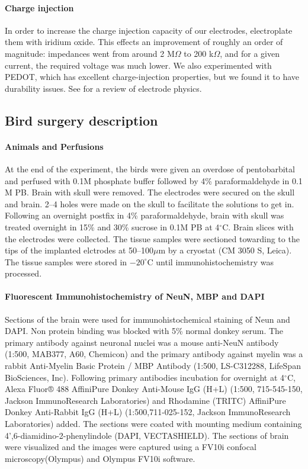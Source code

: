 \documentclass[10pt,letterpaper]{article}
\let\oldmarginpar\marginpar
\renewcommand{\marginpar}[1]{\oldmarginpar{\linespread{1}\scriptsize{#1}}}
\renewcommand{\subsubsection}[1]{\paragraph{#1}}
\begin{document}
\subsubsection{Charge injection}

In order to increase the charge injection capacity of our electrodes,
electroplate them with iridium oxide.  This effects an
improvement of roughly an order of magnitude: impedances went from
around 2 M$\Omega$ to 200 k$\Omega$, and for a given current, the
required voltage was much lower.\marginpar{FIXME} We also experimented
with PEDOT, which has excellent charge-injection properties, but we
found it to have durability issues.\marginpar{All I know about this is
  hearsay.}  See \cite{Cogan2008electrodes} for a review of electrode
physics.
\subsection{Bird surgery description}

\subsubsection{Animals and Perfusions}

At the end of the experiment, the birds were given an overdose of
pentobarbital and perfused with 0.1M phosphate buffer followed by 4\%
paraformaldehyde in 0.1 M PB.  Brain with skull were removed. The
electrodes were secured on the skull and brain. 2--4 holes were made
on the skull to facilitate the solutions to get in. Following an
overnight postfix in 4\% paraformaldehyde, brain with skull was
treated overnight in 15\% and 30\% sucrose\marginpar{Which?} in 0.1M PB at 4$^\circ$C.
Brain slices with the electrodes were collected. The tissue samples
were sectioned towarding to the tips of the implanted elctrodes at
50--100$\mu$m by a cryostat (CM 3050 S, Leica). The tissue samples
were stored in $-20^\circ$C until immunohistochemistry was processed.

\subsubsection{Fluorescent Immunohistochemistry of NeuN, MBP and DAPI}

Sections of the brain were used for immunohistochemical staining of
Neun and DAPI. Non protein binding was blocked with 5\% normal donkey
serum. The primary antibody against neuronal nuclei was a mouse
anti-NeuN antibody (1:500, MAB377, A60, Chemicon) and the primary
antibody against myelin was a rabbit Anti-Myelin Basic Protein / MBP
Antibody (1:500, LS-C312288, LifeSpan BioSciences, Inc). Following
primary antibodies incubation for overnight at 4$^\circ$C, Alexa
Fluor® 488 AffiniPure Donkey Anti-Mouse IgG (H+L) (1:500, 715-545-150,
Jackson ImmunoResearch Laboratories) and Rhodamine (TRITC) AffiniPure
Donkey Anti-Rabbit IgG (H+L) (1:500,711-025-152, Jackson
ImmunoResearch Laboratories) added. The sections were coated with
mounting medium containing 4',6-diamidino-2-phenylindole (DAPI,
VECTASHIELD).  The sections of brain were visualized and the images
were captured using a FV10i confocal microscopy(Olympus) and Olympus
FV10i software.
\end{document}
